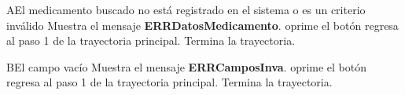 		\begin{UCtrayectoriaA}{A}{El medicamento buscado no est\'a registrado en el sistema o es un criterio inv\'alido}
			\UCpaso Muestra el mensaje {\bf ERRDatosMedicamento}.
			\UCpaso[\UCactor] oprime el botón 
			\UCPaso[\UCactor] regresa al paso 1 de la trayectoria principal.  
			\UCpaso[] Termina la trayectoria.
		\end{UCtrayectoriaA}
		
		
		\begin{UCtrayectoriaB}{B}{El campo vac\'io}
			\UCpaso Muestra el mensaje {\bf ERRCamposInva}.
			\UCpaso[\UCactor] oprime el botón 
			\UCPaso[\UCactor] regresa al paso 1 de la trayectoria principal.  
			\UCpaso[] Termina la trayectoria.
		\end{UCtrayectoriaB}
		
